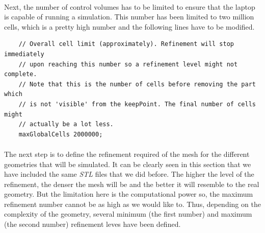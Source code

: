\paragraph{}Next, the number of control volumes has to be limited to ensure that the laptop is capable of running a simulation. This number has been limited to two million cells, which is a pretty high number and the following lines have to be modified.

\begin{footnotesize}
\begin{verbatim}
    // Overall cell limit (approximately). Refinement will stop immediately
    // upon reaching this number so a refinement level might not complete.
    // Note that this is the number of cells before removing the part which
    // is not 'visible' from the keepPoint. The final number of cells might
    // actually be a lot less.
    maxGlobalCells 2000000;
\end{verbatim}
\end{footnotesize}

\paragraph{}The next step is to define the refinement required of the mesh for the different geometries that will be simulated. It can be clearly seen in this section that we have included the same \textit{STL} files that we did before. The higher the level of the refinement, the denser the mesh will be and the better it will resemble to the real geometry. But the limitation here is the computational power so, the maximum refinement number cannot be as high as we would like to. Thus, depending on the complexity of the geometry, several minimum (the first number) and maximum (the second number) refinement leves have been defined.

